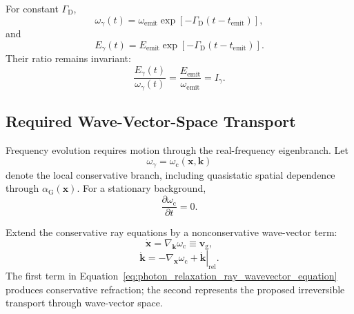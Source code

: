 For constant \(\Gamma_{\mathrm D}\),
\begin{equation}
    \omega_\gamma(t)
    =
    \omega_{\mathrm{emit}}
    \exp
    \left[
        -
        \Gamma_{\mathrm D}
        \left(
            t-t_{\mathrm{emit}}
        \right)
    \right],
    \label{eq:photon_relaxation_frequency_solution}
\end{equation}
and
\begin{equation}
    E_\gamma(t)
    =
    E_{\mathrm{emit}}
    \exp
    \left[
        -
        \Gamma_{\mathrm D}
        \left(
            t-t_{\mathrm{emit}}
        \right)
    \right].
    \label{eq:photon_relaxation_transport_energy_solution}
\end{equation}
Their ratio remains invariant:
\begin{equation}
    \frac{
        E_\gamma(t)
    }{
        \omega_\gamma(t)
    }
    =
    \frac{
        E_{\mathrm{emit}}
    }{
        \omega_{\mathrm{emit}}
    }
    =
    I_\gamma.
    \label{eq:photon_relaxation_action_ratio_preserved}
\end{equation}


\subsection{Required Wave-Vector-Space Transport}
\label{subsec:photon_relaxation_wavevector_drag}

Frequency evolution requires motion through the real-frequency eigenbranch.
Let
\begin{equation}
    \omega_\gamma
    =
    \omega_{\mathrm c}
    \left(
        \mathbf x,
        \mathbf k
    \right)
    \label{eq:photon_relaxation_local_conservative_branch}
\end{equation}
denote the local conservative branch, including quasistatic spatial dependence
through \(\alpha_{\mathrm G}(\mathbf x)\). For a stationary background,
\begin{equation}
    \frac{
        \partial\omega_{\mathrm c}
    }{
        \partial t
    }
    =
    0.
    \label{eq:photon_relaxation_stationary_branch}
\end{equation}

Extend the conservative ray equations by a nonconservative wave-vector term:
\begin{equation}
    \dot{\mathbf x}
    =
    \nabla_{\mathbf k}\omega_{\mathrm c}
    \equiv
    \mathbf v_{\mathrm g},
    \label{eq:photon_relaxation_ray_position_equation}
\end{equation}
\begin{equation}
    \dot{\mathbf k}
    =
    -
    \nabla_{\mathbf x}\omega_{\mathrm c}
    +
    \left.
        \dot{\mathbf k}
    \right|_{\mathrm{rel}}.
    \label{eq:photon_relaxation_ray_wavevector_equation}
\end{equation}
The first term in
Equation~\eqref{eq:photon_relaxation_ray_wavevector_equation} produces
conservative refraction; the second represents the proposed irreversible
transport through wave-vector space.

